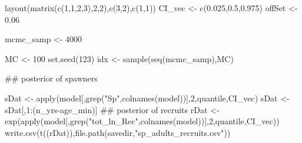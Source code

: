 \documentclass[
  11pt,
]{article}
\newenvironment{Shaded}{}{}
\newcommand{\CommentTok}[1]{\textcolor[rgb]{0.00,0.50,0.00}{#1}}
\newcommand{\DecValTok}[1]{#1}
\newcommand{\FloatTok}[1]{#1}
\newcommand{\KeywordTok}[1]{\textcolor[rgb]{0.00,0.00,1.00}{#1}}
\newcommand{\NormalTok}[1]{#1}
\newcommand{\OperatorTok}[1]{#1}
\newcommand{\StringTok}[1]{\textcolor[rgb]{0.00,0.50,0.50}{#1}}
\begin{document}
\begin{Shaded}
\begin{Highlighting}[]
\KeywordTok{layout}\NormalTok{(}\KeywordTok{matrix}\NormalTok{(}\KeywordTok{c}\NormalTok{(}\DecValTok{1}\NormalTok{,}\DecValTok{1}\NormalTok{,}\DecValTok{2}\NormalTok{,}\DecValTok{3}\NormalTok{),}\DecValTok{2}\NormalTok{,}\DecValTok{2}\NormalTok{),}\KeywordTok{c}\NormalTok{(}\DecValTok{3}\NormalTok{,}\DecValTok{2}\NormalTok{),}\KeywordTok{c}\NormalTok{(}\DecValTok{1}\NormalTok{,}\DecValTok{1}\NormalTok{))}
\NormalTok{CI_vec <-}\StringTok{ }\KeywordTok{c}\NormalTok{(}\FloatTok{0.025}\NormalTok{,}\FloatTok{0.5}\NormalTok{,}\FloatTok{0.975}\NormalTok{)}
\NormalTok{offSet <-}\StringTok{ }\FloatTok{0.06}

\NormalTok{mcmc_samp <-}\StringTok{ }\DecValTok{4000}

\NormalTok{MC <-}\StringTok{ }\DecValTok{100}
\KeywordTok{set.seed}\NormalTok{(}\DecValTok{123}\NormalTok{)}
\NormalTok{idx <-}\StringTok{ }\KeywordTok{sample}\NormalTok{(}\KeywordTok{seq}\NormalTok{(mcmc_samp),MC)}

\CommentTok{## posterior of spawners}

\NormalTok{sDat <-}\StringTok{ }\KeywordTok{apply}\NormalTok{(model[,}\KeywordTok{grep}\NormalTok{(}\StringTok{"Sp"}\NormalTok{,}\KeywordTok{colnames}\NormalTok{(model))],}\DecValTok{2}\NormalTok{,quantile,CI_vec)}
\NormalTok{sDat <-}\StringTok{ }\NormalTok{sDat[,}\DecValTok{1}\OperatorTok{:}\NormalTok{(n_yrs}\OperatorTok{-}\NormalTok{age_min)]}
\CommentTok{## posterior of recruits}
\NormalTok{rDat <-}\StringTok{ }\KeywordTok{exp}\NormalTok{(}\KeywordTok{apply}\NormalTok{(model[,}\KeywordTok{grep}\NormalTok{(}\StringTok{"tot_ln_Rec"}\NormalTok{,}\KeywordTok{colnames}\NormalTok{(model))],}\DecValTok{2}\NormalTok{,quantile,CI_vec))}
\KeywordTok{write.csv}\NormalTok{(}\KeywordTok{t}\NormalTok{((rDat)),}\KeywordTok{file.path}\NormalTok{(savedir,}\StringTok{"sp_adults_recruits.csv"}\NormalTok{))}



\end{Highlighting}
\end{Shaded}
\end{document}
